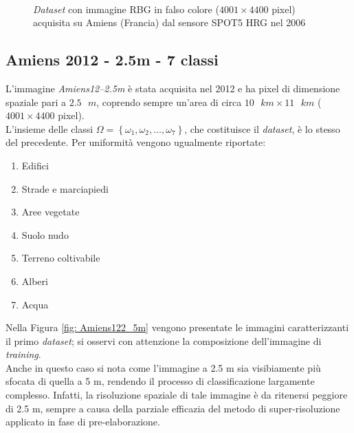 \clearpage

\begin{figure}[!ht]
   \center
   \\%
     \hspace{4mm}
    \caption{\emph{Dataset} con immagine RBG in falso colore ($4001\times4400$ pixel) acquisita su Amiens (Francia) dal sensore \textsc{SPOT5 HRG} nel 2006}
    \label{fig: Amiens62_5m}
  \end{figure}
\clearpage


\subsection{Amiens 2012 - 2.5m - 7 classi}
L'immagine \emph{Amiens12--2.5m} è stata acquisita nel 2012 e ha pixel di dimensione spaziale pari a $2.5\text{ }m$, coprendo sempre un'area di circa $10\text{ }km\times11\text{ }km$ ($4001\times4400$ pixel).\\
L'insieme delle classi $\Omega=\left\lbrace\omega_1,\omega_2,\ldots,\omega_{7}\right\rbrace$, che costituisce il \emph{dataset}, è lo stesso del precedente. Per uniformità vengono ugualmente riportate:
\begin{enumerate}
\item Edifici
\item Strade e marciapiedi
\item Aree vegetate
\item Suolo nudo
\item Terreno coltivabile
\item Alberi
\item Acqua
\end{enumerate}
Nella Figura \ref{fig: Amiens122_5m} vengono presentate le immagini caratterizzanti il primo \emph{dataset}; si osservi con attenzione la composizione dell'immagine di \emph{training}.\\
Anche in questo caso si nota come l'immagine a 2.5 m sia visibiamente più sfocata di quella a 5 m, rendendo il processo di classificazione largamente complesso. Infatti, la risoluzione spaziale di tale immagine è da ritenersi peggiore di 2.5 m, sempre a causa della parziale efficazia del metodo di super-risoluzione applicato in fase di pre-elaborazione.

